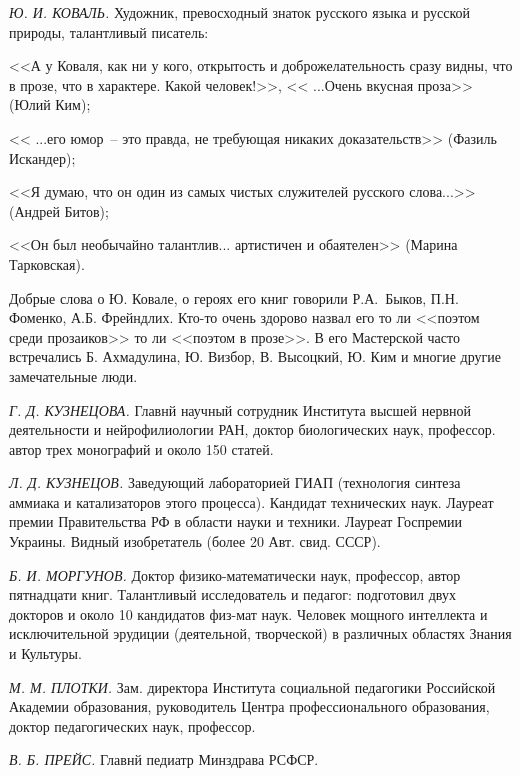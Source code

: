 \textit{Ю. И. КОВАЛЬ.} Художник, превосходный знаток русского языка и русской природы, талантливый писатель:

<<А у Коваля, как ни у кого, открытость и доброжелательность сразу видны, что в прозе, что в характере. Какой человек!>>, << ...Очень вкусная проза>> (Юлий Ким);

<< ...его юмор~-- это правда, не требующая никаких доказательств>> (Фазиль Искандер);

<<Я думаю, что он один из самых чистых служителей русского слова...>> (Андрей Битов);

<<Он был необычайно талантлив... артистичен и обаятелен>> (Марина Тарковская).

Добрые слова о Ю. Ковале, о героях его книг говорили Р.А.~Быков, П.Н. Фоменко, А.Б. Фрейндлих. Кто-то очень здорово назвал его то ли <<поэтом среди прозаиков>> то ли <<поэтом в прозе>>. В его Мастерской часто встречались Б. Ахмадулина, Ю. Визбор, В. Высоцкий, Ю. Ким  и многие другие замечательные люди.

\textit{Г. Д. КУЗНЕЦОВА.} Главнй научный сотрудник Института высшей нервной деятельности и нейрофилиологии РАН, доктор биологических наук, профессор. автор трех монографий и около 150 статей.

\textit{Л. Д. КУЗНЕЦОВ.} Заведующий лабораторией ГИАП (технология синтеза аммиака и катализаторов этого процесса). Кандидат технических наук. Лауреат премии Правительства РФ в области науки и техники. Лауреат Госпремии Украины. Видный изобретатель (более 20 Авт. свид. СССР).

\textit{Б. И. МОРГУНОВ.} Доктор физико-математически наук, профессор, автор пятнадцати книг. Талантливый исследователь и педагог: подготовил двух докторов и около 10 кандидатов физ-мат наук. Человек мощного интеллекта и исключительной эрудиции (деятельной, творческой) в различных областях Знания и Культуры.

\textit{М. М. ПЛОТКИ.} Зам. директора Института социальной педагогики Российской Академии образования, руководитель Центра профессионального образования, доктор педагогических наук, профессор.

\textit{В. Б. ПРЕЙС.} Главнй педиатр Минздрава РСФСР.
